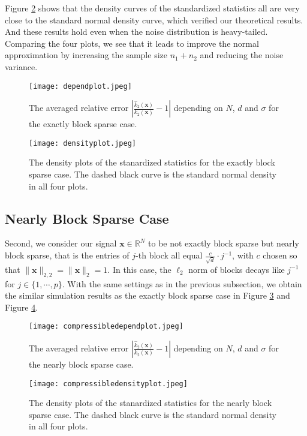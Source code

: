 \documentclass[journal,onecolumn]{IEEEtran}
\begin{document}
Figure \ref{fig_4} shows that the density curves of the standardized statistics all are very close to the standard normal density curve, which verified our theoretical results. And these results hold even when the noise distribution is heavy-tailed. Comparing the four plots, we see that it leads to improve the normal approximation by increasing the sample size $n_1+n_2$ and reducing the noise variance.

\begin{figure}[!t]
	\centering
	\texttt{[image: dependplot.jpeg]}
	\caption{The averaged relative error $|\frac{\hat{k}_2(\mathbf{x})}{k_2(\mathbf{x})}-1|$ depending on $N$, $d$ and $\sigma$ for the exactly block sparse case.}
	\label{fig_3}
\end{figure}


\begin{figure}[!t]
	\centering
	\texttt{[image: densityplot.jpeg]}
	\caption{The density plots of the stanardized statistics for the exactly block sparse case. The dashed black curve is the standard normal density in all four plots.}
	\label{fig_4}
\end{figure}


\subsection{Nearly Block Sparse Case}

Second, we consider our signal $\mathbf{x}\in\mathbb{R}^N$ to be not exactly block sparse but nearly block sparse, that is the entries of $j$-th block all equal $\frac{c}{\sqrt{d}}\cdot j^{-1}$, with $c$ chosen so that $\lVert \mathbf{x}\rVert_{2,2}=\lVert \mathbf{x}\rVert_{2}=1$. In this case, the $\ell_2$ norm of blocks decays like $j^{-1}$ for $j\in \{1,\cdots,p\}$. With the same settings as in the previous subsection, we obtain the similar simulation results as the exactly block sparse case in Figure \ref{fig_5} and Figure \ref{fig_6}.

\begin{figure}[!t]
	\centering
	\texttt{[image: compressibledependplot.jpeg]}
	\caption{The averaged relative error $|\frac{\hat{k}_2(\mathbf{x})}{k_2(\mathbf{x})}-1|$ depending on $N$, $d$ and $\sigma$ for the nearly block sparse case.}
	\label{fig_5}
\end{figure}

\begin{figure}[!t]
	\centering
	\texttt{[image: compressibledensityplot.jpeg]}
	\caption{The density plots of the stanardized statistics for the nearly block sparse case. The dashed black curve is the standard normal density in all four plots.}
	\label{fig_6}
\end{figure}
\end{document}
